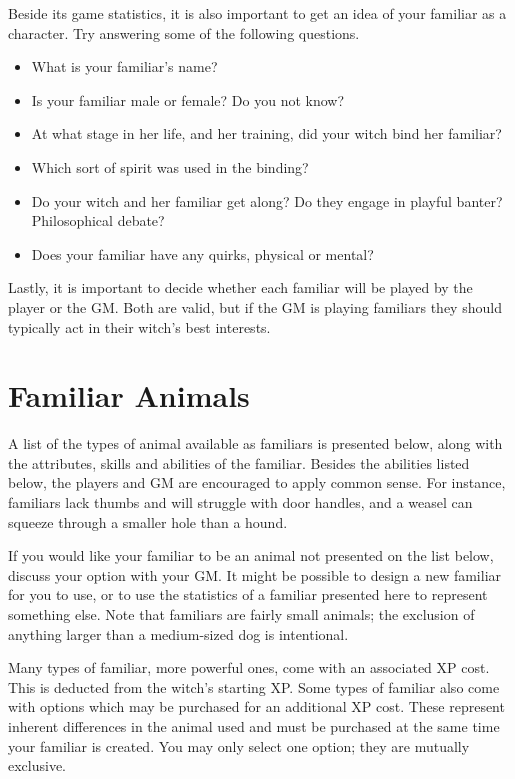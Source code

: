 Beside its game statistics, it is also important to get an idea of your familiar as a character.
Try answering some of the following questions.

\begin{itemize}
	\item What is your familiar's name?
	\item Is your familiar male or female?
		Do you not know?
	\item At what stage in her life, and her training, did your witch bind her familiar?
	\item Which sort of spirit was used in the binding? %
	\item Do your witch and her familiar get along?
		Do they engage in playful banter?
		Philosophical debate?
	\item Does your familiar have any quirks, physical or mental?
\end{itemize}

Lastly, it is important to decide whether each familiar will be played by the player or the GM.
Both are valid, but if the GM is playing familiars they should typically act in their witch's best interests.

\section{Familiar Animals}

A list of the types of animal available as familiars is presented below, along with the attributes, skills and abilities of the familiar.
Besides the abilities listed below, the players and GM are encouraged to apply common sense.
For instance, familiars lack thumbs and will struggle with door handles, and a weasel can squeeze through a smaller hole than a hound.

If you would like your familiar to be an animal not presented on the list below, discuss your option with your GM.
It might be possible to design a new familiar for you to use, or to use the statistics of a familiar presented here to represent something else.
Note that familiars are fairly small animals; the exclusion of anything larger than a medium-sized dog is intentional.

Many types of familiar, more powerful ones, come with an associated XP cost.
This is deducted from the witch's starting XP.
Some types of familiar also come with options which may be purchased for an additional XP cost.
These represent inherent differences in the animal used and must be purchased at the same time your familiar is created.
You may only select one option; they are mutually exclusive.

